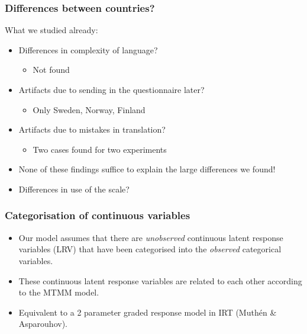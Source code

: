 \documentclass{beamer}
\begin{document}
\begin{frame}
\frametitle{Differences between countries?}

What we studied already:

\begin{itemize}[<alert@+>]
	\item Differences in complexity of language? 
		\begin{itemize}[<2-|alert@+>]\item{Not found}\end{itemize}
	\item Artifacts due to sending in the questionnaire later?
		\begin{itemize}[<4-|alert@+>]\item{Only Sweden, Norway, Finland}\end{itemize} 
	\item Artifacts due to mistakes in translation?
		\begin{itemize}[<6-|alert@+>]\item{Two cases found for two experiments}\end{itemize} 
	\item<7-|alert@+> None of these findings suffice to explain the large differences we found!
	\item<8-|alert@+> Differences in use of the scale?
\end{itemize}

\end{frame}

\begin{frame}
	\frametitle{Categorisation of continuous variables}

    \begin{itemize}
    \item Our model assumes that there are \emph{unobserved} continuous latent response variables (LRV) that have been categorised into the \emph{observed} categorical variables.
    \item These continuous latent response variables are related to each other according to the MTMM model.
    \item Equivalent to a 2 parameter graded response model in IRT (Muth\'en \& Asparouhov).
    \end{itemize}
\end{frame}
\end{document}
